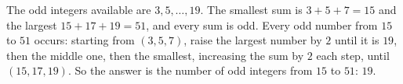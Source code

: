 The odd integers available are $3,5,\dots,19$. The smallest sum is $3+5+7=15$ and the largest $15+17+19=51$, and every sum is odd. Every odd number from $15$ to $51$ occurs: starting from $(3,5,7)$, raise the largest number by $2$ until it is $19$, then the middle one, then the smallest, increasing the sum by $2$ each step, until $(15,17,19)$. So the answer is the number of odd integers from $15$ to $51$: $\boxed{19}$.

